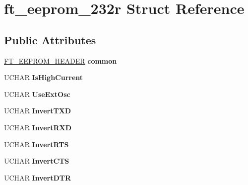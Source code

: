\hypertarget{structft__eeprom__232r}{}\section{ft\+\_\+eeprom\+\_\+232r Struct Reference}
\label{structft__eeprom__232r}
\subsection*{Public Attributes}
\begin{DoxyCompactItemize}
\item 
\hyperlink{structft__eeprom__header}{F\+T\+\_\+\+E\+E\+P\+R\+O\+M\+\_\+\+H\+E\+A\+D\+ER} {\bfseries common}\hypertarget{structft__eeprom__232r_a04ed9a15b88229df4567d6c9ccd6c99d}{}\label{structft__eeprom__232r_a04ed9a15b88229df4567d6c9ccd6c99d}

\item 
U\+C\+H\+AR {\bfseries Is\+High\+Current}\hypertarget{structft__eeprom__232r_abd8a4afecd3fa431c7654d14886395dd}{}\label{structft__eeprom__232r_abd8a4afecd3fa431c7654d14886395dd}

\item 
U\+C\+H\+AR {\bfseries Use\+Ext\+Osc}\hypertarget{structft__eeprom__232r_af430c36e3ca675a6860463b70b963369}{}\label{structft__eeprom__232r_af430c36e3ca675a6860463b70b963369}

\item 
U\+C\+H\+AR {\bfseries Invert\+T\+XD}\hypertarget{structft__eeprom__232r_ae284d5a2e53c8e77dcbdd7789734b8f0}{}\label{structft__eeprom__232r_ae284d5a2e53c8e77dcbdd7789734b8f0}

\item 
U\+C\+H\+AR {\bfseries Invert\+R\+XD}\hypertarget{structft__eeprom__232r_afbb26654eac5fa6266726e42f26ed317}{}\label{structft__eeprom__232r_afbb26654eac5fa6266726e42f26ed317}

\item 
U\+C\+H\+AR {\bfseries Invert\+R\+TS}\hypertarget{structft__eeprom__232r_accb739bb2d2c81f31cb9e7e634d15e7c}{}\label{structft__eeprom__232r_accb739bb2d2c81f31cb9e7e634d15e7c}

\item 
U\+C\+H\+AR {\bfseries Invert\+C\+TS}\hypertarget{structft__eeprom__232r_a95c9b6e2547151c62c36a981e3d121e6}{}\label{structft__eeprom__232r_a95c9b6e2547151c62c36a981e3d121e6}

\item 
U\+C\+H\+AR {\bfseries Invert\+D\+TR}\hypertarget{structft__eeprom__232r_a782d2b0ecc30bae4b3f967fc349f6808}{}\label{structft__eeprom__232r_a782d2b0ecc30bae4b3f967fc349f6808}


\end{DoxyCompactItemize}
